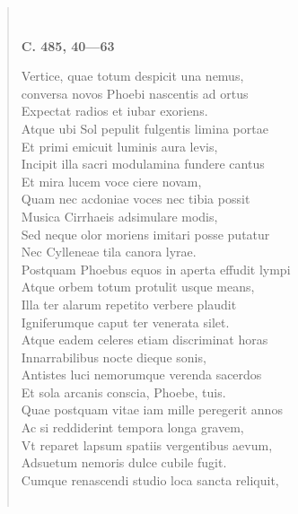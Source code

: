 \documentclass[11pt, a4paper]{report}
\begin{document}
\begin{verse}
        ﻿\pagebreak 
    \begin{center} \textbf{C. 485, 40—63} \end{center} \marginpar{[00]} Vertice, quae totum despicit una nemus, \\ conversa novos Phoebi nascentis ad ortus \\ Expectat radios et iubar exoriens. \\ Atque ubi Sol pepulit fulgentis limina portae \\ Et primi emicuit luminis aura levis, \\ Incipit illa sacri modulamina fundere cantus \\ Et mira lucem voce ciere novam, \\ Quam nec acdoniae voces nec tibia possit \\ Musica Cirrhaeis adsimulare modis, \\ Sed neque olor moriens imitari posse putatur \\ Nec Cylleneae tila canora lyrae. \\ Postquam Phoebus equos in aperta effudit lympi \\ Atque orbem totum protulit usque means, \\ Illa ter alarum repetito verbere plaudit \\ Igniferumque caput ter venerata silet. \\ Atque eadem celeres etiam discriminat horas \\ Innarrabilibus nocte dieque sonis, \\ Antistes luci nemorumque verenda sacerdos \\ Et sola arcanis conscia, Phoebe, tuis. \\ Quae postquam vitae iam mille peregerit annos \\ Ac si reddiderint tempora longa gravem, \\ Vt reparet lapsum spatiis vergentibus aevum, \\ Adsuetum nemoris dulce cubile fugit. \\ Cumque renascendi studio loca sancta reliquit, \\ 
        ﻿\pagebreak 

\end{verse}
\end{document}
